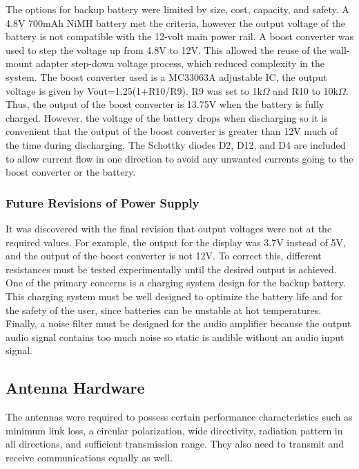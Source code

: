\documentclass[journal,compsoc]{IEEEtran}
\begin{document}
The options for backup battery were limited by size, cost, capacity, and safety.  A 4.8V 700mAh NiMH battery met the criteria, however the output voltage of the battery is not compatible with the 12-volt main power rail.  A boost converter was used to step the voltage up from 4.8V to 12V.  This allowed the reuse of the wall-mount adapter step-down voltage process, which reduced complexity in the system.  The boost converter used is a MC33063A adjustable IC, the output voltage is given by Vout=1.25(1+R10/R9).  R9 was set to 1k$\Omega$ and R10 to 10k$\Omega$.  Thus, the output of the boost converter is 13.75V when the battery is fully charged.  However, the voltage of the battery drops when discharging so it is convenient that the output of the boost converter is greater than 12V much of the time during discharging.  The Schottky diodes D2, D12, and D4 are included to allow current flow in one direction to avoid any unwanted currents going to the boost converter or the battery.

\subsubsection{Future Revisions of Power Supply}

It was discovered with the final revision that output voltages were not at the required values.  For example, the output for the display was 3.7V instead of 5V, and the output of the boost converter is not 12V.  To correct this, different resistances must be tested experimentally until the desired output is achieved.  One of the primary concerns is a charging system design for the backup battery.  This charging system must be well designed to optimize the battery life and for the safety of the user, since batteries can be unstable at hot temperatures.  Finally, a noise filter must be designed for the audio amplifier because the output audio signal contains too much noise so static is audible without an audio input signal.

\subsection {Antenna Hardware}

The antennas were required to possess certain performance characteristics such as minimum link loss, a circular polarization, wide directivity, radiation pattern in all directions, and sufficient transmission range.  They also need to transmit and receive communications equally as well.
\end{document}
